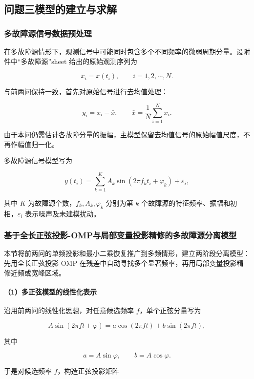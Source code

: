 \subsection{问题三模型的建立与求解}


\subsubsection{多故障源信号数据预处理}


在多故障源情形下，观测信号中可能同时包含多个不同频率的微弱周期分量。设附件中“多故障源”sheet 给出的原始观测序列为


\[
x_i=x(t_i),\qquad i=1,2,\cdots,N.
\]



与前两问保持一致，首先对原始信号进行去均值处理：


\[
y_i=x_i-\bar{x},\qquad 
\bar{x}=\frac{1}{N}\sum_{i=1}^{N}x_i.
\]


由于本问仍需估计各故障分量的振幅，主模型保留去均值信号的原始幅值尺度，不再作幅值归一化。


多故障源信号模型写为


\[
y(t_i)=\sum_{k=1}^{K}A_k\sin(2\pi f_k t_i+\varphi_k)+\varepsilon_i,
\]


其中 \(K\) 为故障源个数，\(f_k,A_k,\varphi_k\) 分别为第 \(k\) 个故障源的特征频率、振幅和初相，\(\varepsilon_i\) 表示噪声及未建模扰动。




\subsubsection{基于全长正弦投影-OMP与局部变量投影精修的多故障源分离模型}


本节将前两问的单频投影和最小二乘恢复推广到多频情形，建立两阶段分离模型：先用全长正弦投影-OMP 在残差中自动寻找多个显著频率，再用局部变量投影精修近频或宽峰区域。


\paragraph{（1）多正弦模型的线性化表示}


沿用前两问的线性化思想，对任意候选频率 \(f\)，单个正弦分量写为


\[
A\sin(2\pi ft+\varphi)
=a\cos(2\pi ft)+b\sin(2\pi ft),
\]


其中


\[
a=A\sin\varphi,\qquad b=A\cos\varphi.
\]


于是对候选频率 \(f\)，构造正弦投影矩阵


